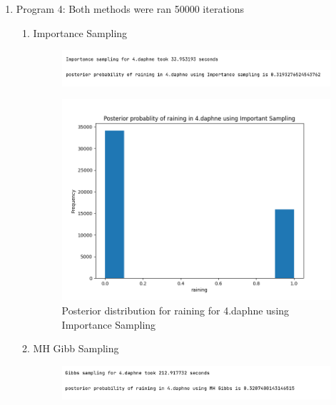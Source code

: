 \documentclass{article}
\begin{document}
\begin{enumerate}
\begin{enumerate}
\end{enumerate}

\item Program 4: Both methods were ran 50000 iterations
\begin{enumerate}
\item Importance Sampling

\begin{figure}[!ht]
	\centering
	\includegraphics[scale=0.6]{../figs/IS/4_program_results}
\end{figure}

\begin{figure}[!ht]
	\centering
	\includegraphics[scale=0.5]{../figs/IS/posterior_histogram_4_daphne}
	 \caption{Posterior distribution for raining for 4.daphne using Importance Sampling}
\end{figure}

\newpage
\item MH Gibb Sampling

\begin{figure}[!ht]
	\centering
	\includegraphics[scale=0.5]{../figs/Gibbs/4_program_results}
\end{figure}


\end{enumerate}
\end{enumerate}
\end{document}
